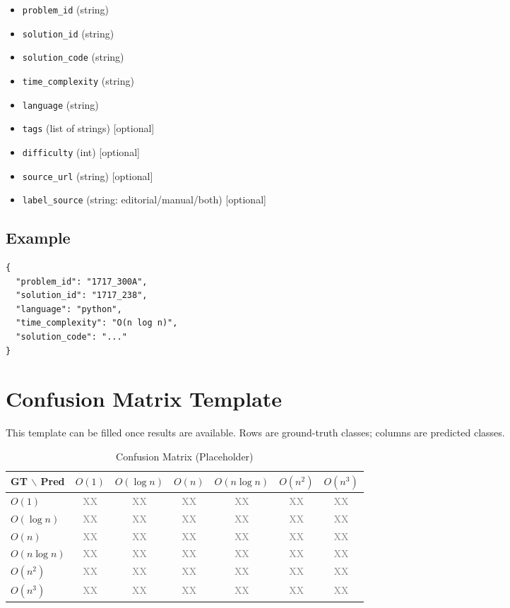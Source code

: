 \documentclass[conference]{IEEEtran}
\newcommand{\placeholder}{\textcolor{gray}{XX}}
\begin{document}
\begin{itemize}[leftmargin=1.2em]
\item \texttt{problem\_id} (string)
\item \texttt{solution\_id} (string)
\item \texttt{solution\_code} (string)
\item \texttt{time\_complexity} (string)
\item \texttt{language} (string)
\item \texttt{tags} (list of strings) [optional]
\item \texttt{difficulty} (int) [optional]
\item \texttt{source\_url} (string) [optional]
\item \texttt{label\_source} (string: editorial/manual/both) [optional]
\end{itemize}

\subsection{Example}
\begin{verbatim}
{
  "problem_id": "1717_300A",
  "solution_id": "1717_238",
  "language": "python",
  "time_complexity": "O(n log n)",
  "solution_code": "..."
}
\end{verbatim}

\section{Confusion Matrix Template}

This template can be filled once results are available.
Rows are ground-truth classes; columns are predicted classes.

\begin{table}[h]
\centering
\caption{Confusion Matrix (Placeholder)}
\begin{tabular}{lcccccc}
\toprule
GT $\backslash$ Pred
& $O(1)$
& $O(\log n)$
& $O(n)$
& $O(n\log n)$
& $O(n^2)$
& $O(n^3)$ \\
\midrule
$O(1)$ & \placeholder & \placeholder & \placeholder & \placeholder & \placeholder & \placeholder \\
$O(\log n)$ & \placeholder & \placeholder & \placeholder & \placeholder & \placeholder & \placeholder \\
$O(n)$ & \placeholder & \placeholder & \placeholder & \placeholder & \placeholder & \placeholder \\
$O(n\log n)$ & \placeholder & \placeholder & \placeholder & \placeholder & \placeholder & \placeholder \\
$O(n^2)$ & \placeholder & \placeholder & \placeholder & \placeholder & \placeholder & \placeholder \\
$O(n^3)$ & \placeholder & \placeholder & \placeholder & \placeholder & \placeholder & \placeholder \\
\bottomrule
\end{tabular}
\end{table}
\end{document}

